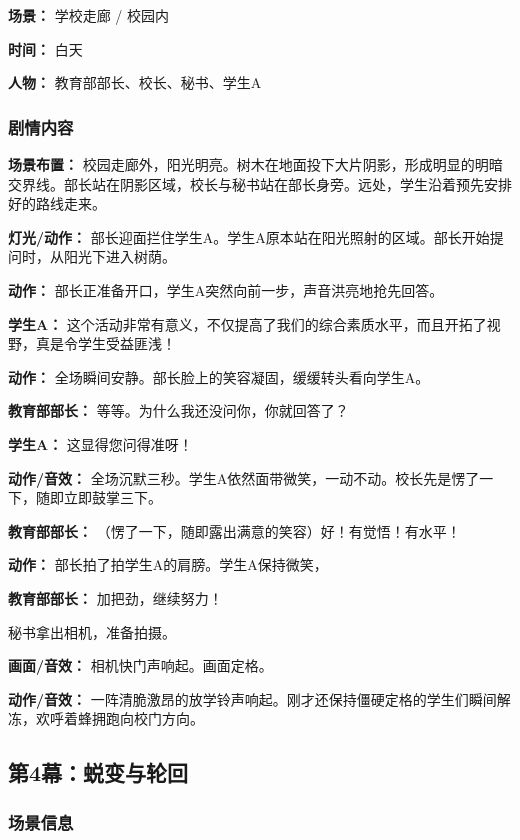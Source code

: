 \documentclass[11pt, a4paper]{article}
\begin{document}
	\textbf{场景：} 学校走廊 / 校园内
	
	\textbf{时间：} 白天
	
	\textbf{人物：} 教育部部长、校长、秘书、学生A
	
	\subsubsection{剧情内容}
	
	\textbf{场景布置：}
	校园走廊外，阳光明亮。树木在地面投下大片阴影，形成明显的明暗交界线。部长站在阴影区域，校长与秘书站在部长身旁。远处，学生沿着预先安排好的路线走来。
	
	\textbf{灯光/动作：}
	部长迎面拦住学生A。学生A原本站在阳光照射的区域。部长开始提问时，从阳光下进入树荫。
	
	\textbf{动作：}
	部长正准备开口，学生A突然向前一步，声音洪亮地抢先回答。
	
	\textbf{学生A：}
	这个活动非常有意义，不仅提高了我们的综合素质水平，而且开拓了视野，真是令学生受益匪浅！
	
	\textbf{动作：}
	全场瞬间安静。部长脸上的笑容凝固，缓缓转头看向学生A。
	
	\textbf{教育部部长：}
	等等。为什么我还没问你，你就回答了？
	
	\textbf{学生A：}
	这显得您问得准呀！
	
	\textbf{动作/音效：}
	全场沉默三秒。学生A依然面带微笑，一动不动。校长先是愣了一下，随即立即鼓掌三下。
	
	\textbf{教育部部长：}
	（愣了一下，随即露出满意的笑容）好！有觉悟！有水平！
	
	\textbf{动作：}
	部长拍了拍学生A的肩膀。学生A保持微笑，
	
	\textbf{教育部部长：}
	加把劲，继续努力！
	
	秘书拿出相机，准备拍摄。
	
	\textbf{画面/音效：}
	相机快门声响起。画面定格。
	
	\textbf{动作/音效：}
	一阵清脆激昂的放学铃声响起。刚才还保持僵硬定格的学生们瞬间解冻，欢呼着蜂拥跑向校门方向。
	
	\newpage
	
	\subsection{第4幕：蜕变与轮回}
	
	\subsubsection{场景信息}
	
\end{document}
